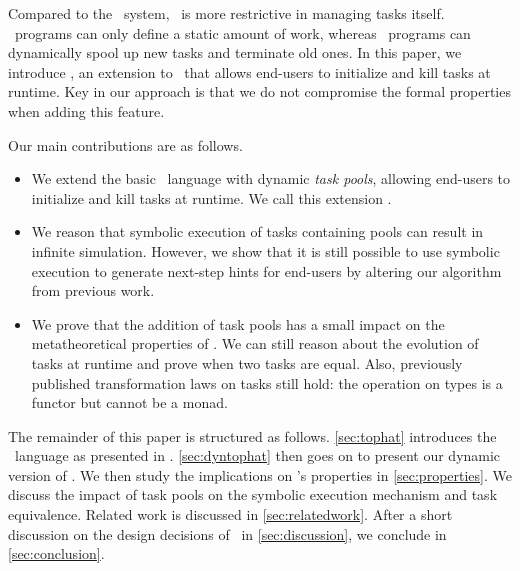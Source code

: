 Compared to the \ITASKS\ system, \TOPHAT\ is more restrictive in managing tasks itself.
\TOPHAT\ programs can only define a static amount of work, whereas \ITASKS\ programs can dynamically spool up new tasks and terminate old ones.
In this paper, we introduce \DYNTOPHAT, an extension to \TOPHAT\ that allows end-users to initialize and kill tasks at runtime.
Key in our approach is that we do not compromise the formal properties when adding this feature.


Our main contributions are as follows.
\begin{itemize}
  \item
    We extend the basic \TOPHAT\ language with dynamic \emph{task pools},
    allowing end-users to initialize and kill tasks at runtime.
    We call this extension \DYNTOPHAT.
  \item
    We reason that symbolic execution of tasks containing pools can result in infinite simulation.
    However, we show that it is still possible to use symbolic execution to generate next-step hints for end-users
    by altering our algorithm from previous work.
  \item
    We prove that the addition of task pools has a small impact on the metatheoretical properties of \TOPHAT.
    We can still reason about the evolution of tasks at runtime
    and prove when two tasks are equal.
    Also, previously published transformation laws on tasks still hold:
    the  operation on types is a functor but cannot be a monad.
\end{itemize}



The remainder of this paper is structured as follows.
\cref{sec:tophat} introduces the \TOPHAT\ language as presented in \citet{Steenvoorden22}.
\cref{sec:dyntophat} then goes on to present our dynamic version of \TOPHAT.
We then study the implications on \TOPHAT's properties in \cref{sec:properties}.
We discuss the impact of task pools on the symbolic execution mechanism and task equivalence.
Related work is discussed in \cref{sec:relatedwork}.
After a short discussion on the design decisions of \DYNTOPHAT\ in \cref{sec:discussion},
we conclude in \cref{sec:conclusion}.
